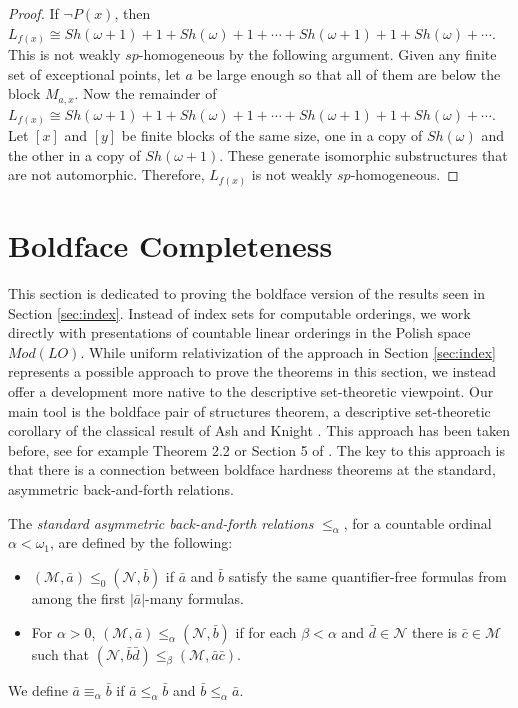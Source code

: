 \documentclass[11pt]{amsart}
\theoremstyle{definition}
\begin{document}
\begin{proof}
If $\neg P(x)$, then  $L_{f(x)}  \cong Sh(\omega+1)+1+Sh(\omega) + 1 + \cdots +Sh(\omega+1)+1+Sh(\omega) + \cdots$. This is not weakly $sp$-homogeneous by the following argument.  Given any finite set of exceptional points, let $a$ be large enough so that all of them are below the block $M_{a,x}$.  Now the remainder of $L_{f(x)} \cong Sh(\omega+1)+1+Sh(\omega) + 1 + \cdots +Sh(\omega+1)+1+Sh(\omega) + \cdots$.
Let $[x]$ and $[y]$ be finite blocks of the same size, one in a copy of $Sh(\omega)$ and the other in a copy of $Sh(\omega+1)$.
These generate isomorphic substructures that are not automorphic.
Therefore, $L_{f(x)}$ is not weakly $sp$-homogeneous.
\end{proof}




\section{Boldface Completeness}\label{sec:Boldface}

This section is dedicated to proving the boldface version of the results seen in Section \ref{sec:index}.
Instead of index sets for computable orderings, we work directly with presentations of countable linear orderings in the Polish space $Mod(LO)$.
While uniform relativization of the approach in Section \ref{sec:index} represents a possible approach to prove the theorems in this section, we instead offer a development more native to the descriptive set-theoretic viewpoint.
Our main tool is the boldface pair of structures theorem, a descriptive set-theoretic corollary of the classical result of Ash and Knight \cite{AK90}.
This approach has been taken before, see for example \cite{HMapprox} Theorem 2.2 or Section 5 of \cite{CGHT}.
The key to this approach is that there is a connection between boldface hardness theorems at the standard, asymmetric back-and-forth relations.

\begin{definition}
The \textit{standard asymmetric back-and-forth relations} $\leq_\alpha$, for a countable ordinal $\alpha < \omega_1$, are defined by the following:
    \begin{itemize}
        \item $(\mathcal{M},\bar{a}) \leq_0 (\mathcal{N},\bar{b})$ if $\bar{a}$ and $\bar{b}$ satisfy the same quantifier-free formulas from among the first $|\bar{a}|$-many formulas.
        \item For $\alpha > 0$, $(\mathcal{M},\bar{a}) \leq_\alpha (\mathcal{N},\bar{b})$ if for each $\beta < \alpha$ and $\bar{d} \in \mathcal{N}$ there is $\bar{c} \in \mathcal{M}$ such that $(\mathcal{N},\bar{b} \bar{d}) \leq_\beta (\mathcal{M},\bar{a} \bar{c})$.
    \end{itemize}
We define $\bar{a} \equiv_\alpha \bar{b}$ if $\bar{a} \leq_\alpha \bar{b}$ and $\bar{b} \leq_\alpha \bar{a}$.
\end{definition}
\end{document}
